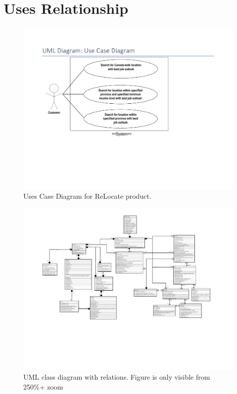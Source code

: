 \documentclass[12pt,fleqn]{article}
\begin{document}

\newpage
\section*{Uses Relationship}
\begin{figure}[h]
  \includegraphics[width=\linewidth] {Group04_Uses_Diagram.pdf}
  \caption{Uses Case Diagram for ReLocate product.}
  \label{fig:uses}
\end{figure}

\begin{figure}
\caption{UML class diagram with relations. Figure is only visible from 250\%+ zoom}
  \hspace*{-4.4cm}\includegraphics[width = 260mm]{Group04_Classes_Diagram.pdf}

\end{figure}
\end{document}
